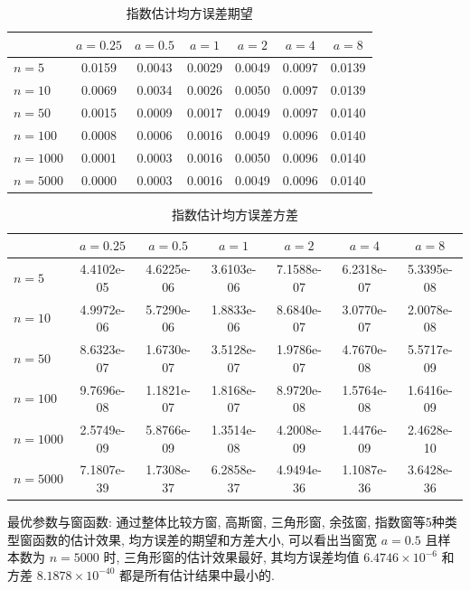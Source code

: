 \documentclass{article}
\begin{document}
\begin{table}[htbp]
  \centering
  \begin{tabular}{l|cccccc}
  \hline
           & $a=0.25$ & $a=0.5$ & $a=1$  & $a=2$  & $a=4$  & $a=8$  \\ \hline
  $n=5$    & 0.0159   & 0.0043  & 0.0029 & 0.0049 & 0.0097 & 0.0139 \\
  $n=10$   & 0.0069   & 0.0034  & 0.0026 & 0.0050 & 0.0097 & 0.0139 \\
  $n=50$   & 0.0015   & 0.0009  & 0.0017 & 0.0049 & 0.0097 & 0.0140 \\
  $n=100$  & 0.0008   & 0.0006  & 0.0016 & 0.0049 & 0.0096 & 0.0140 \\
  $n=1000$ & 0.0001   & 0.0003  & 0.0016 & 0.0050 & 0.0096 & 0.0140 \\
  $n=5000$ & 0.0000   & 0.0003  & 0.0016 & 0.0049 & 0.0096 & 0.0140 \\ \hline
  \end{tabular}
  \caption{指数估计均方误差期望}
  \label{tab:expMeanMSE}
\end{table}

\begin{table}[htbp]
  \centering
  \begin{tabular}{l|cccccc}
  \hline
           & $a=0.25$   & $a=0.5$    & $a=1$      & $a=2$      & $a=4$      & $a=8$      \\ \hline
  $n=5$    & 4.4102e-05 & 4.6225e-06 & 3.6103e-06 & 7.1588e-07 & 6.2318e-07 & 5.3395e-08 \\
  $n=10$   & 4.9972e-06 & 5.7290e-06 & 1.8833e-06 & 8.6840e-07 & 3.0770e-07 & 2.0078e-08 \\
  $n=50$   & 8.6323e-07 & 1.6730e-07 & 3.5128e-07 & 1.9786e-07 & 4.7670e-08 & 5.5717e-09 \\
  $n=100$  & 9.7696e-08 & 1.1821e-07 & 1.8168e-07 & 8.9720e-08 & 1.5764e-08 & 1.6416e-09 \\
  $n=1000$ & 2.5749e-09 & 5.8766e-09 & 1.3514e-08 & 4.2008e-09 & 1.4476e-09 & 2.4628e-10 \\
  $n=5000$ & 7.1807e-39 & 1.7308e-37 & 6.2858e-37 & 4.9494e-36 & 1.1087e-36 & 3.6428e-36 \\ \hline
  \end{tabular}
  \caption{指数估计均方误差方差}
  \label{tab:expVarMSE}
\end{table}

最优参数与窗函数: 通过整体比较方窗, 高斯窗, 三角形窗, 余弦窗, 指数窗等5种类型窗函数的估计效果, 均方误差的期望和方差大小, 可以看出当窗宽 $a=0.5$ 且样本数为 $n=5000$ 时, 三角形窗的估计效果最好, 其均方误差均值 $6.4746\times10^{-6}$ 和方差 $8.1878\times10^{-40}$ 都是所有估计结果中最小的.

\begin{thebibliography}{1}
\end{thebibliography}
\end{document}
